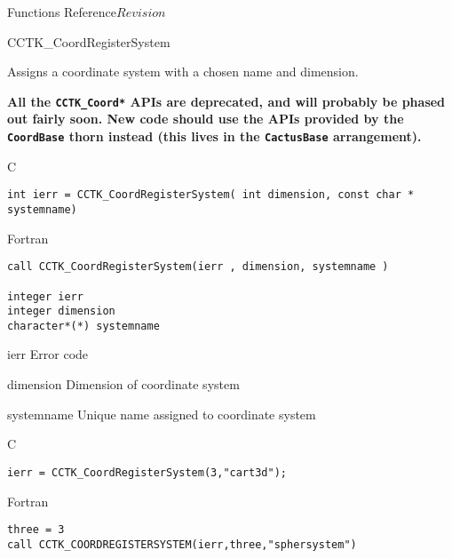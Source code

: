 \begin{cactuspart}{ Functions Reference}{}{$Revision$}

\begin{FunctionDescription}{CCTK\_CoordRegisterSystem}%
{Assigns a coordinate system with a chosen name and dimension.

\textbf{All the \texttt{CCTK\_Coord*} APIs are deprecated,
and will probably be phased out fairly soon.
New code should use the APIs provided by the \texttt{CoordBase} thorn
instead (this lives in the \texttt{CactusBase} arrangement).}
}
\label{CCTK-CoordRegisterSystem}
\begin{SynopsisSection}
\begin{Synopsis}{C}
\begin{verbatim}int ierr = CCTK_CoordRegisterSystem( int dimension, const char * systemname)\end{verbatim}
\end{Synopsis}
\begin{Synopsis}{Fortran}
\begin{verbatim}call CCTK_CoordRegisterSystem(ierr , dimension, systemname )

integer ierr
integer dimension
character*(*) systemname \end{verbatim}
\end{Synopsis}
\end{SynopsisSection}
\begin{ParameterSection}
\begin{Parameter}{ierr}
Error code
\end{Parameter}
\begin{Parameter}{dimension}
Dimension of coordinate system
\end{Parameter}
\begin{Parameter}{systemname}
Unique name assigned to coordinate system
\end{Parameter}
\end{ParameterSection}

\begin{ExampleSection}
\begin{Example}{C}
\begin{verbatim}
ierr = CCTK_CoordRegisterSystem(3,"cart3d");
\end{verbatim}
\end{Example}
\begin{Example}{Fortran}
\begin{verbatim}
three = 3
call CCTK_COORDREGISTERSYSTEM(ierr,three,"sphersystem")
\end{verbatim}
\end{Example}
\end{ExampleSection}
\end{FunctionDescription}


\end{cactuspart}
